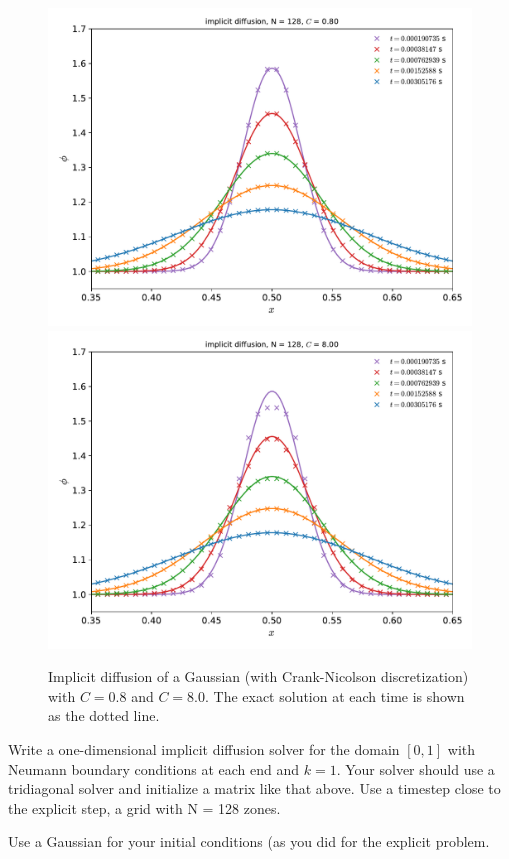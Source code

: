 \begin{figure}[t]
\centering
\includegraphics[width=0.75\linewidth]{diff-implicit-128-CFL_0_8}\\
\includegraphics[width=0.75\linewidth]{diff-implicit-128-CFL_8_0}
\caption[Implicit diffusion of a Gaussian]{\label{fig:diffuse}
  Implicit diffusion of a Gaussian (with Crank-Nicolson
  discretization) with $C = 0.8$ and $C = 8.0$.  The exact solution at
  each time is shown as the dotted
  line. \\ }
\end{figure}

\begin{exercise}
{Write a one-dimensional implicit diffusion solver for the
  domain $[0,1]$ with Neumann boundary conditions at each end and $k = 1$.
  Your solver should use a tridiagonal solver and initialize a matrix like
  that above.  Use a timestep close to the explicit step, a grid with
  N = 128 zones.

  Use a Gaussian for your initial conditions (as you did for the 
  explicit problem.}
\end{exercise}


